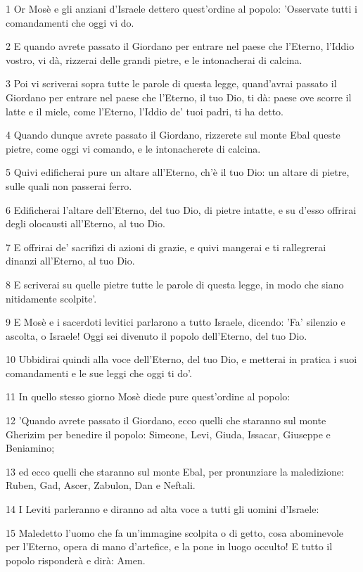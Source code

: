 \par 1 Or Mosè e gli anziani d'Israele dettero quest'ordine al popolo: 'Osservate tutti i comandamenti che oggi vi do.
\par 2 E quando avrete passato il Giordano per entrare nel paese che l'Eterno, l'Iddio vostro, vi dà, rizzerai delle grandi pietre, e le intonacherai di calcina.
\par 3 Poi vi scriverai sopra tutte le parole di questa legge, quand'avrai passato il Giordano per entrare nel paese che l'Eterno, il tuo Dio, ti dà: paese ove scorre il latte e il miele, come l'Eterno, l'Iddio de' tuoi padri, ti ha detto.
\par 4 Quando dunque avrete passato il Giordano, rizzerete sul monte Ebal queste pietre, come oggi vi comando, e le intonacherete di calcina.
\par 5 Quivi edificherai pure un altare all'Eterno, ch'è il tuo Dio: un altare di pietre, sulle quali non passerai ferro.
\par 6 Edificherai l'altare dell'Eterno, del tuo Dio, di pietre intatte, e su d'esso offrirai degli olocausti all'Eterno, al tuo Dio.
\par 7 E offrirai de' sacrifizi di azioni di grazie, e quivi mangerai e ti rallegrerai dinanzi all'Eterno, al tuo Dio.
\par 8 E scriverai su quelle pietre tutte le parole di questa legge, in modo che siano nitidamente scolpite'.
\par 9 E Mosè e i sacerdoti levitici parlarono a tutto Israele, dicendo: 'Fa' silenzio e ascolta, o Israele! Oggi sei divenuto il popolo dell'Eterno, del tuo Dio.
\par 10 Ubbidirai quindi alla voce dell'Eterno, del tuo Dio, e metterai in pratica i suoi comandamenti e le sue leggi che oggi ti do'.
\par 11 In quello stesso giorno Mosè diede pure quest'ordine al popolo:
\par 12 'Quando avrete passato il Giordano, ecco quelli che staranno sul monte Gherizim per benedire il popolo: Simeone, Levi, Giuda, Issacar, Giuseppe e Beniamino;
\par 13 ed ecco quelli che staranno sul monte Ebal, per pronunziare la maledizione: Ruben, Gad, Ascer, Zabulon, Dan e Neftali.
\par 14 I Leviti parleranno e diranno ad alta voce a tutti gli uomini d'Israele:
\par 15 Maledetto l'uomo che fa un'immagine scolpita o di getto, cosa abominevole per l'Eterno, opera di mano d'artefice, e la pone in luogo occulto! E tutto il popolo risponderà e dirà: Amen.
